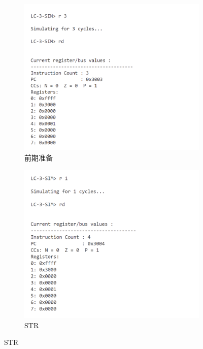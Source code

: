 \documentclass[UTF8]{ctexart}
\begin{document}
\begin{figure}[ht]
  \centering
  \begin{subfigure}{0.45\textwidth}
    \includegraphics[width=\linewidth]{str1.png}
    \caption{前期准备}
  \end{subfigure}
  \begin{subfigure}{0.45\textwidth}
    \includegraphics[width=\linewidth]{str2.png}
    \caption{STR}
  \end{subfigure}


\end{figure}
\end{document}
